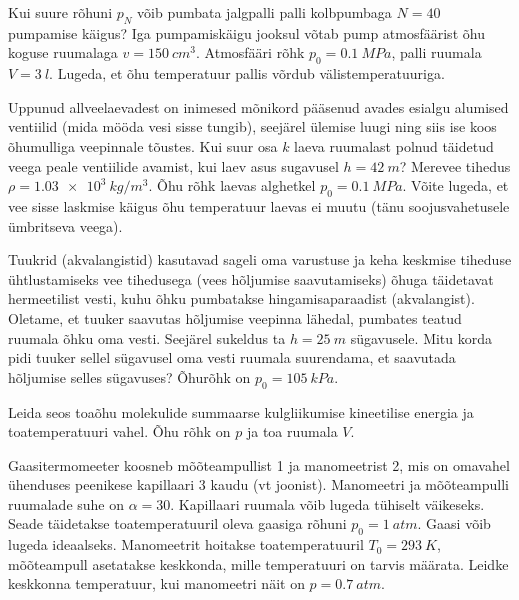 \documentclass[10pt, twoside]{article}
\begin{document}
{
Kui suure rõhuni $p_N$ võib pumbata jalgpalli palli kolbpumbaga $N = 40$ pumpamise käigus? Iga pumpamiskäigu jooksul võtab pump atmosfäärist õhu koguse ruumalaga $v = \SI{150}{cm^3}$. Atmosfääri rõhk $p_0 = \SI{0,1}{MPa}$, palli ruumala $V = \SI{3}{l}$. Lugeda, et õhu temperatuur pallis võrdub välistemperatuuriga.
\probend
\bigskip


Uppunud allveelaevadest on inimesed mõnikord pääsenud avades esialgu alumised ventiilid (mida mööda vesi sisse tungib), seejärel ülemise luugi ning siis ise koos õhumulliga veepinnale tõustes. Kui suur osa $k$ laeva ruumalast polnud täidetud veega peale ventiilide avamist, kui laev asus sugavusel $h = \SI{42}{m}$? Merevee tihedus $\rho = \SI{1,03e3}{kg/m^3}$. Õhu rõhk laevas alghetkel $p_0 = \SI{0,1}{MPa}$. Võite lugeda, et vee sisse laskmise käigus õhu temperatuur laevas ei muutu (tänu soojusvahetusele ümbritseva veega).
\probend
\bigskip


Tuukrid (akvalangistid) kasutavad sageli oma varustuse ja keha keskmise tiheduse ühtlustamiseks vee tihedusega (vees hõljumise saavutamiseks) õhuga täidetavat hermeetilist vesti, kuhu õhku pumbatakse hingamisaparaadist (akvalangist). Oletame, et tuuker saavutas hõljumise veepinna lähedal, pumbates teatud ruumala õhku oma vesti. Seejärel sukeldus ta $h = \SI{25}{m}$ sügavusele. Mitu korda pidi tuuker sellel sügavusel oma vesti ruumala suurendama, et saavutada hõljumise selles sügavuses? Õhurõhk on $p_0 = \SI{105}{kPa}$.
\probend
\bigskip


Leida seos toaõhu molekulide summaarse kulgliikumise kineetilise energia ja toatemperatuuri vahel. Õhu rõhk on $p$ ja toa ruumala $V$.
\probend
\bigskip


Gaasitermomeeter koosneb mõõteampullist 1 ja manomeetrist 2, mis on omavahel ühenduses peenikese kapillaari 3 kaudu (vt joonist). Manomeetri ja mõõteampulli ruumalade suhe on $\alpha = 30$. Kapillaari ruumala võib lugeda tühiselt väikeseks. Seade täidetakse toatemperatuuril oleva gaasiga rõhuni $p_0 = \SI{1}{atm}$. Gaasi võib lugeda ideaalseks. Manomeetrit hoitakse toatemperatuuril $T_0 = \SI{293}{K}$, mõõteampull asetatakse keskkonda, mille temperatuuri on tarvis määrata. Leidke keskkonna temperatuur, kui manomeetri näit on $p = \SI{0,7}{atm}$.

}
\end{document}
